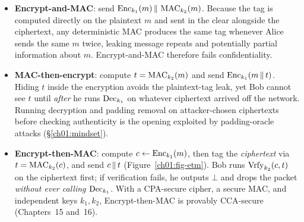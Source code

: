 \begin{itemize}
  \item \textbf{Encrypt-and-MAC}: send $\operatorname{Enc}_{k_1}(m) \,\|\, \operatorname{MAC}_{k_2}(m)$. Because the tag is computed directly on the plaintext $m$ and sent in the clear alongside the ciphertext, any deterministic MAC produces the same tag whenever Alice sends the same $m$ twice, leaking message repeats and potentially partial information about $m$. Encrypt-and-MAC therefore fails confidentiality.
  \item \textbf{MAC-then-encrypt}: compute $t = \operatorname{MAC}_{k_2}(m)$ and send $\operatorname{Enc}_{k_1}(m \,\|\, t)$. Hiding $t$ inside the encryption avoids the plaintext-tag leak, yet Bob cannot see $t$ until \emph{after} he runs $\operatorname{Dec}_{k_1}$ on whatever ciphertext arrived off the network. Running decryption and padding removal on attacker-chosen ciphertexts before checking authenticity is the opening exploited by padding-oracle attacks (\S\ref{ch01:mindset}).
  \item \textbf{Encrypt-then-MAC}: compute $c \gets \operatorname{Enc}_{k_1}(m)$, then tag the \emph{ciphertext} via $t = \operatorname{MAC}_{k_2}(c)$, and send $c \,\|\, t$ (Figure~\ref{ch01:fig-etm}). Bob runs $\operatorname{Vrfy}_{k_2}(c, t)$ on the ciphertext first; if verification fails, he outputs $\bot$ and drops the packet \emph{without ever calling $\operatorname{Dec}_{k_1}$}. With a CPA-secure cipher, a secure MAC, and independent keys $k_1, k_2$, Encrypt-then-MAC is provably CCA-secure (Chapters~15 and~16).
\end{itemize}

